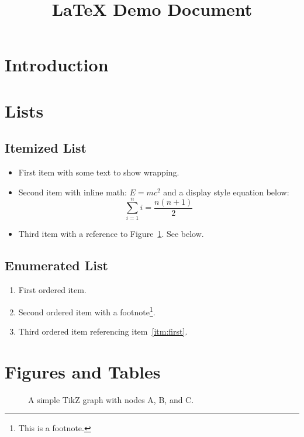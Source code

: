 \documentclass[11pt]{article}
\title{LaTeX Demo Document}
\author{}
\date{}
\begin{document}
\maketitle

\section{Introduction}
\lipsum[1][1-3]

\section{Lists}

\subsection{Itemized List}
\begin{itemize}[noitemsep]
\item First item with some text to show wrapping.
\item Second item with inline math: $E=mc^2$ and a display style equation below:
\begin{equation*}
	\sum_{i=1}^{n} i = \frac{n(n+1)}{2}
\end{equation*}
\item Third item with a reference to Figure~\ref{fig:simple}. See below.
\end{itemize}

\subsection{Enumerated List}
\begin{enumerate}[noitemsep]
	\item First ordered item.\label{itm:first}
	\item Second ordered item with a footnote\footnote{This is a footnote.}.
	\item Third ordered item referencing item~\ref{itm:first}.
\end{enumerate}



\section{Figures and Tables}

\begin{figure}[H]
	\centering
	\caption{A simple TikZ graph with nodes A, B, and C.}\label{fig:simple}
\end{figure}
\end{document}
